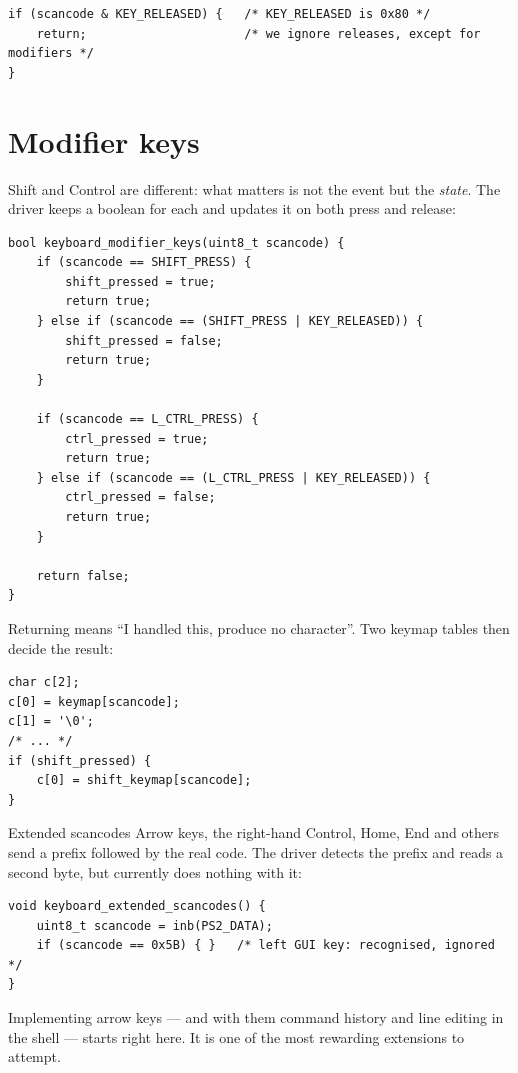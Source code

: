 \begin{lstlisting}[style=c]
if (scancode & KEY_RELEASED) {   /* KEY_RELEASED is 0x80 */
    return;                      /* we ignore releases, except for modifiers */
}
\end{lstlisting}

\section{Modifier keys}

Shift and Control are different: what matters is not the event but the \emph{state}. The driver
keeps a boolean for each and updates it on both press and release:

\begin{lstlisting}[style=c]
bool keyboard_modifier_keys(uint8_t scancode) {
    if (scancode == SHIFT_PRESS) {
        shift_pressed = true;
        return true;
    } else if (scancode == (SHIFT_PRESS | KEY_RELEASED)) {
        shift_pressed = false;
        return true;
    }

    if (scancode == L_CTRL_PRESS) {
        ctrl_pressed = true;
        return true;
    } else if (scancode == (L_CTRL_PRESS | KEY_RELEASED)) {
        ctrl_pressed = false;
        return true;
    }

    return false;
}
\end{lstlisting}

Returning  means ``I handled this, produce no character''. Two keymap tables then decide
the result:

\begin{lstlisting}[style=c]
char c[2];
c[0] = keymap[scancode];
c[1] = '\0';
/* ... */
if (shift_pressed) {
    c[0] = shift_keymap[scancode];
}
\end{lstlisting}

\begin{warn}{Extended scancodes}
Arrow keys, the right-hand Control, Home, End and others send a  prefix followed by the
real code. The driver detects the prefix and reads a second byte, but currently does nothing with
it:
\begin{lstlisting}[style=c]
void keyboard_extended_scancodes() {
    uint8_t scancode = inb(PS2_DATA);
    if (scancode == 0x5B) { }   /* left GUI key: recognised, ignored */
}
\end{lstlisting}
Implementing arrow keys --- and with them command history and line editing in the shell --- starts
right here. It is one of the most rewarding extensions to attempt.
\end{warn}

